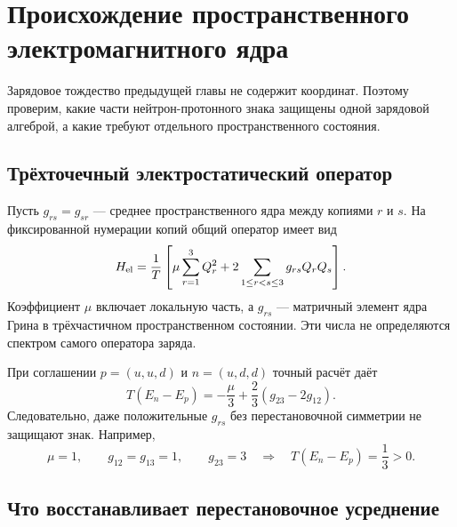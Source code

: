 \chapter{Происхождение пространственного электромагнитного ядра}
\label{ch:v8-baryon-em-spatial-kernel-origin-gate}

Зарядовое тождество предыдущей главы не содержит координат. Поэтому
проверим, какие части нейтрон-протонного знака защищены одной зарядовой
алгеброй, а какие требуют отдельного пространственного состояния.

\section{Трёхточечный электростатический оператор}

Пусть $g_{rs}=g_{sr}$ --- среднее пространственного ядра между копиями
$r$ и $s$. На фиксированной нумерации копий общий оператор имеет вид
\begin{equation}
 H_{\rm el}=\frac1T\left[
 \mu\sum_{r=1}^{3}Q_r^2
 +2\sum_{1\le r<s\le3}g_{rs}Q_rQ_s
 \right].
 \label{eq:v8-baryon-em-spatial-general-operator}
\end{equation}
Коэффициент $\mu$ включает локальную часть, а $g_{rs}$ --- матричный
элемент ядра Грина в трёхчастичном пространственном состоянии. Эти числа
не определяются спектром самого оператора заряда.

При соглашении $p=(u,u,d)$ и $n=(u,d,d)$ точный расчёт даёт
\begin{equation}
 T(E_n-E_p)
 =-\frac{\mu}{3}+\frac{2}{3}(g_{23}-2g_{12}).
 \label{eq:v8-baryon-em-labelled-spatial-splitting}
\end{equation}
Следовательно, даже положительные $g_{rs}$ без перестановочной симметрии
не защищают знак. Например,
\begin{equation}
 \mu=1,\qquad g_{12}=g_{13}=1,\qquad g_{23}=3
 \quad\Longrightarrow\quad
 T(E_n-E_p)=\frac13>0.
 \label{eq:v8-baryon-em-positive-kernel-sign-counterexample}
\end{equation}

\section{Что восстанавливает перестановочное усреднение}

